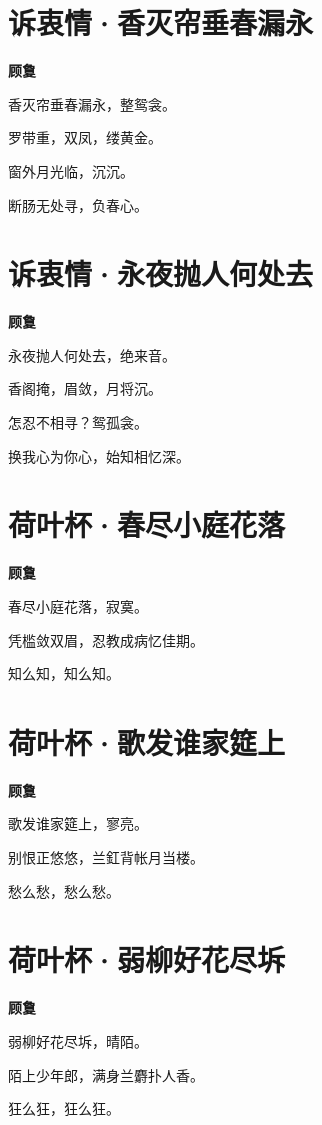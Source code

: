 \documentclass[12pt,a4paper]{ctexbook}
\begin{document}
\section{诉衷情·香灭帘垂春漏永}
\textbf{顾敻}\par\vspace{0.5em}
香灭帘垂春漏永，整鸳衾。\par
罗带重，双凤，缕黄金。\par
窗外月光临，沉沉。\par
断肠无处寻，负春心。\par

\section{诉衷情·永夜抛人何处去}
\textbf{顾敻}\par\vspace{0.5em}
永夜抛人何处去，绝来音。\par
香阁掩，眉敛，月将沉。\par
怎忍不相寻？鸳孤衾。\par
换我心为你心，始知相忆深。\par

\section{荷叶杯·春尽小庭花落}
\textbf{顾敻}\par\vspace{0.5em}
春尽小庭花落，寂寞。\par
凭槛敛双眉，忍教成病忆佳期。\par
知么知，知么知。\par

\section{荷叶杯·歌发谁家筵上}
\textbf{顾敻}\par\vspace{0.5em}
歌发谁家筵上，寥亮。\par
别恨正悠悠，兰釭背帐月当楼。\par
愁么愁，愁么愁。\par

\section{荷叶杯·弱柳好花尽坼}
\textbf{顾敻}\par\vspace{0.5em}
弱柳好花尽坼，晴陌。\par
陌上少年郎，满身兰麝扑人香。\par
狂么狂，狂么狂。\par
\end{document}
